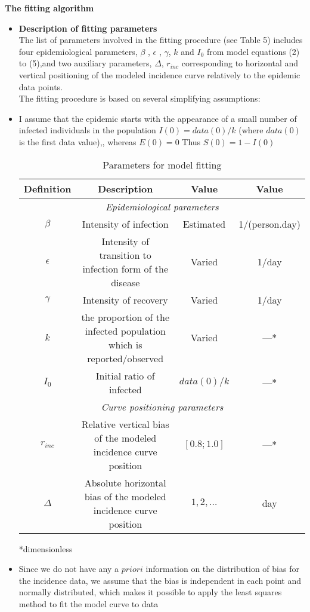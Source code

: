 \documentclass{exam}
\begin{document}
\textbf{The fitting algorithm} 
\begin{itemize}
	\item \textbf{Description of fitting parameters}\\
	The list of parameters involved in the fitting procedure (see Table 5) includes four epidemiological parameters, $\beta$ , $\epsilon$ , $\gamma$, $k$ and $I_0$ from model equations (2) to (5),and two auxiliary parameters, $\Delta$, $r_{inc}$  corresponding to horizontal and vertical positioning of
	the modeled incidence curve relatively to the epidemic data points.\\
	The fitting procedure is based on several simplifying assumptions:\\
	\item I assume that the epidemic starts with the appearance of a small number of infected individuals in the population $I(0)=data(0)/k$ (where $data(0)$ is the first data value),, whereas $E(0)=0$ Thus $S(0)=1-I(0)$

\begin{center}
	\begin{table}[h!]
			\begin{tabular}{||c c c c||} 			
			\hline
			Definition & Description & Value & Value \\ [0.5ex] 
			\hline
			\hline
			\multicolumn{4}{|c|}{\textit{Epidemiological parameters}}\\
			\hline			
			$\beta$ & Intensity of infection & Estimated &  1/(person.day) \\ 
			\hline
			$\epsilon$ & Intensity of transition to infection form
			of the disease & Varied & 1/day \\
			\hline
			$\gamma$ & Intensity of recovery & Varied & 1/day \\
			\hline
			$k$ & the proportion of the infected population which is reported/observed & Varied &  —* \\
			\hline
			$I_0$  & Initial ratio of infected & $data(0)/k$ & —* \\ [1ex] 
			\hline
				\multicolumn{4}{|c|}{\textit{Curve positioning parameters}}\\
			\hline
			$r_{inc}$  &Relative vertical bias of the modeled
			incidence curve position & $[0.8; 1.0] $ & —* \\ [1ex] 	
			\hline
			$\Delta$  &Absolute horizontal bias of the modeled incidence curve position & $1,2,\ldots $ & day \\ [1ex] 	
			\hline
		\end{tabular}
		\caption{Parameters for model fitting}
		\label{table:5}
	\end{table}
\end{center}
*dimensionless
\item Since we do not have any a $priori$ information on the distribution of bias
for the incidence data, we assume that the bias is independent in each point
and normally distributed, which makes it possible to apply the least squares
method to fit the model curve to data
\end{itemize}
\end{document}
